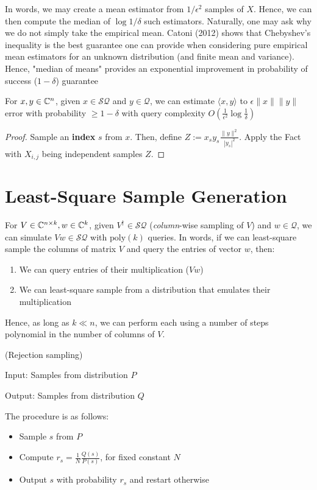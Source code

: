 \documentclass[main.tex]{subfiles}
\begin{document}
In words, we may create a mean estimator from $1/\epsilon^2$ samples of $X$. Hence, we can then compute the median of $\log 1/\delta$ such estimators. Naturally, one may ask why we do not simply take the empirical mean. Catoni (2012) shows that Chebyshev's inequality is the best guarantee one can provide when considering pure empirical mean estimators for an unknown distribution (and finite mean and variance). Hence, "median of means" provides an exponential improvement in probability of success ($1 - \delta$) guarantee

\begin{corollary} For $x,y \in\mathbb{C}^n$, given $x \in \mathcal{SQ}$ and $y \in \mathcal{Q}$, we can estimate $\langle x,y\rangle$ to $\epsilon\|x\|\|y\|$ error with probability $\geq 1-\delta$ with query complexity $O(\frac{1}{\epsilon^2}\log\frac{1}{\delta})$
\end{corollary}
\begin{proof}Sample an \textbf{index} $s$ from $x$. Then, define $Z := x_s y_s\frac{\|y\|^2}{|y_s|^2}$. Apply the Fact with $X_{i,j}$ being independent samples $Z$.
\end{proof}	

\section{Least-Square Sample Generation}

For $V \in \mathbb{C}^{n\times k}, w \in \mathbb{C}^k$, given $V^\dagger \in \mathcal{SQ}$ (\textit{column}-wise sampling of $V$) and $w \in \mathcal{Q}$, we can simulate $Vw \in \mathcal{SQ}$ with $\text{poly}(k)$ queries. In words, if we can least-square sample the columns of matrix $V$ and query the entries of vector $w$, then: 

\begin{enumerate}
\item  We can query entries of their multiplication ($Vw$) 
\item We can least-square sample from a distribution that emulates their multiplication	
\end{enumerate}

Hence, as long as $k \ll n$, we can perform  each using a number of steps polynomial in the number of columns of $V$. 

\begin{algorithm}(Rejection sampling)

Input: Samples from distribution $P$

Output: Samples from distribution $Q$

The procedure is as follows:

\begin{itemize}
\item Sample $s$ from $P$
\item Compute $r_s = \frac{1}{N}\frac{Q(s)}{P(s)}$, for fixed constant $N$
\item Output $s$ with probability $r_s$ and restart otherwise
\end{itemize}
\end{algorithm}
\end{document}

